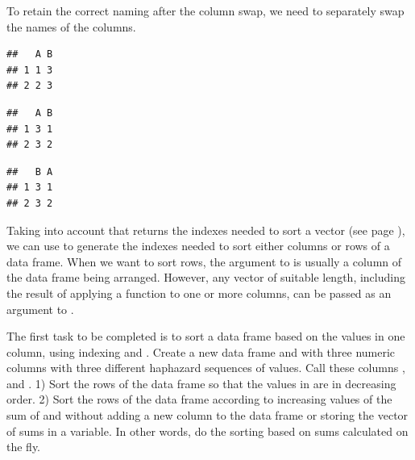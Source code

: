\documentclass[krantz2]{krantz}\usepackage{knitr}
\begin{document}
To retain the correct naming after the column swap, we need to separately swap the names of the columns.
\begin{knitrout}\footnotesize
{}\color{fgcolor}\begin{kframe}
\begin{alltt}
 \hlkwb{<-} \hlstd{(} \hlstd{=} \hlopt{:}\hlstd{,}  \hlstd{=} \hlstd{)}
 \hlstd{)}
\end{alltt}
\begin{verbatim}
##   A B
## 1 1 3
## 2 2 3
\end{verbatim}
\begin{alltt}
\hlstd{my_data_frame.df[ ,} \hlopt{:}\hlstd{]} \hlkwb{<-} \hlstd{my_data_frame.df[ ,} \hlopt{:}\hlstd{]}
 \hlstd{)}
\end{alltt}
\begin{verbatim}
##   A B
## 1 3 1
## 2 3 2
\end{verbatim}
\begin{alltt}
\hlstd{(my_data_frame.df)[}\hlopt{:}\hlstd{]} \hlkwb{<-} \hlstd{(my_data_frame.df)[}\hlopt{:}\hlstd{]}
 \hlstd{)}
\end{alltt}
\begin{verbatim}
##   B A
## 1 3 1
## 2 3 2
\end{verbatim}
\end{kframe}
\end{knitrout}

Taking into account that  returns the indexes needed to sort a vector (see page \pageref{box:vec:sort}), we can use  to generate the indexes needed to sort either columns or rows of a data frame. When we want to sort rows, the argument to  is usually a column of the data frame being arranged. However, any vector of suitable length, including the result of applying a function to one or more columns, can be passed as an argument to .

\begin{playground}
The first task to be completed is to sort a data frame based on the values in one column, using indexing and . Create a new data frame and with three numeric columns with three different haphazard sequences of values. Call these columns ,  and . 1) Sort the rows of the data frame so that the values in  are in decreasing order. 2) Sort the rows of the data frame according to increasing values of the sum of  and  without adding a new column to the data frame or storing the vector of sums in a variable. In other words, do the sorting based on sums calculated on the fly.
\end{playground}
\end{document}
